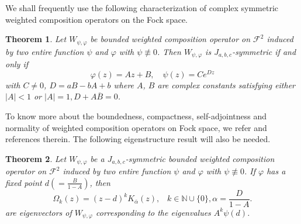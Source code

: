 \documentclass[reqno]{amsart}
\newtheorem{Theorem}{Theorem}
\theoremstyle{remark}
\theoremstyle{Definition}
\theoremstyle{remark}
\numberwithin{equation}{section}
\begin{document}
We shall frequently use the following characterization of complex symmetric weighted composition operators on the Fock space.
\begin{Theorem}\cite{PVL}\label{t1}
  Let $W_{\psi, \varphi}$ be bounded weighted composition operator on $\mathcal{F}^{2}$ induced by two entire function $\psi$ and $\varphi$ with $\psi\not\equiv 0 $. Then  $W_{\psi, \varphi}$ is $J_{a,b,c}$-symmetric  if and only if
  $$\varphi(z)= Az+B,\quad \psi(z)=Ce^{Dz}$$ 
  with $C\neq 0$, $D=aB-bA+b$ where $A$, $B$ are complex constants satisfying either $|A|< 1$
  or $|A|=1, D+A\overline{B}=0$.
\end{Theorem}
To know more about the boundedness, compactness, self-adjointness and normality of weighted composition operators on Fock space, we refer \cite{TL1}and references therein.
The following eigenstructure result will also be needed.
\begin{Theorem}\cite{PVL}\label{t2}Let $W_{\psi, \varphi}$ be a $J_{a,b,c}$-symmetric bounded weighted composition operator on $\mathcal{F}^{2}$ induced by two entire function $\psi$ and $\varphi$ with $\psi\not\equiv 0 $. If $\varphi$ has a fixed point $d(=\frac{B}{1-A})$, then 
$$\Omega_{k}(z)= (z-d)^{k}K_{\overline{\alpha}}(z),\;\;\; k\in \mathbb{N}\cup \{0\}, \alpha=\frac{D}{1-A}.  $$
are eigenvectors of $W_{\psi, \varphi}$ corresponding to the eigenvalues $A^{k}\psi(d)$.
\end{Theorem}
\end{document}

